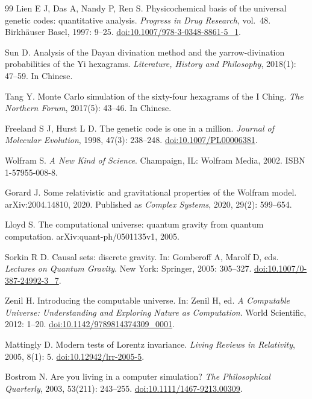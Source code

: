 \documentclass[11pt,a4paper]{article}
\begin{document}
\begin{thebibliography}{99}
Lien E J, Das A, Nandy P, Ren S.
Physicochemical basis of the universal genetic codes: quantitative analysis.
\emph{Progress in Drug Research}, vol.~48. Birkh\"auser Basel, 1997: 9--25.
\href{https://doi.org/10.1007/978-3-0348-8861-5_1}{doi:10.1007/978-3-0348-8861-5\_1}.

Sun D.
Analysis of the Dayan divination method and the yarrow-divination probabilities
of the Yi hexagrams.
\emph{Literature, History and Philosophy}, 2018(1): 47--59. In Chinese.

Tang Y.
Monte Carlo simulation of the sixty-four hexagrams of the I Ching.
\emph{The Northern Forum}, 2017(5): 43--46. In Chinese.

Freeland S J, Hurst L D.
The genetic code is one in a million.
\emph{Journal of Molecular Evolution}, 1998, 47(3): 238--248.
\href{https://doi.org/10.1007/PL00006381}{doi:10.1007/PL00006381}.

Wolfram S.
\emph{A New Kind of Science}.
Champaign, IL: Wolfram Media, 2002. ISBN 1-57955-008-8.

Gorard J.
Some relativistic and gravitational properties of the Wolfram model.
arXiv:2004.14810, 2020.
Published as \emph{Complex Systems}, 2020, 29(2): 599--654.

Lloyd S.
The computational universe: quantum gravity from quantum computation.
arXiv:quant-ph/0501135v1, 2005.

Sorkin R D.
Causal sets: discrete gravity.
In: Gomberoff A, Marolf D, eds. \emph{Lectures on Quantum Gravity}.
New York: Springer, 2005: 305--327.
\href{https://doi.org/10.1007/0-387-24992-3_7}{doi:10.1007/0-387-24992-3\_7}.

Zenil H.
Introducing the computable universe.
In: Zenil H, ed. \emph{A Computable Universe: Understanding and Exploring Nature
as Computation}. World Scientific, 2012: 1--20.
\href{https://doi.org/10.1142/9789814374309_0001}{doi:10.1142/9789814374309\_0001}.

Mattingly D.
Modern tests of Lorentz invariance.
\emph{Living Reviews in Relativity}, 2005, 8(1): 5.
\href{https://doi.org/10.12942/lrr-2005-5}{doi:10.12942/lrr-2005-5}.

Bostrom N.
Are you living in a computer simulation?
\emph{The Philosophical Quarterly}, 2003, 53(211): 243--255.
\href{https://doi.org/10.1111/1467-9213.00309}{doi:10.1111/1467-9213.00309}.

\end{thebibliography}
\end{document}

